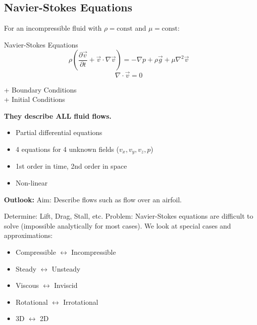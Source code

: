 \newpage
\subsection{Navier-Stokes Equations}
For an incompressible fluid with $\rho = \text{const}$ and $\mu = \text{const}$:

\begin{eqbox}{Navier-Stokes Equations}
$$ \rho \left( \frac{\partial \vec{v}}{\partial t} + \vec{v} \cdot \nabla \vec{v} \right) = -\nabla p + \rho \vec{g} + \mu \nabla^2 \vec{v} $$
$$ \nabla \cdot \vec{v} = 0 $$
\end{eqbox}

+ Boundary Conditions\\
+ Initial Conditions

\textbf{They describe ALL fluid flows.}
\begin{itemize}
    \item Partial differential equations
    \item 4 equations for 4 unknown fields ($v_x, v_y, v_z, p$)
    \item 1st order in time, 2nd order in space
    \item Non-linear
\end{itemize}

\textbf{Outlook:}
Aim: Describe flows such as flow over an airfoil.

\begin{center}
\end{center}

Determine: Lift, Drag, Stall, etc.
Problem: Navier-Stokes equations are difficult to solve (impossible analytically for most cases). We look at special cases and approximations:
\begin{itemize}
    \item Compressible $\leftrightarrow$ Incompressible
    \item Steady $\leftrightarrow$ Unsteady
    \item Viscous $\leftrightarrow$ Inviscid
    \item Rotational $\leftrightarrow$ Irrotational
    \item 3D $\leftrightarrow$ 2D
\end{itemize}

